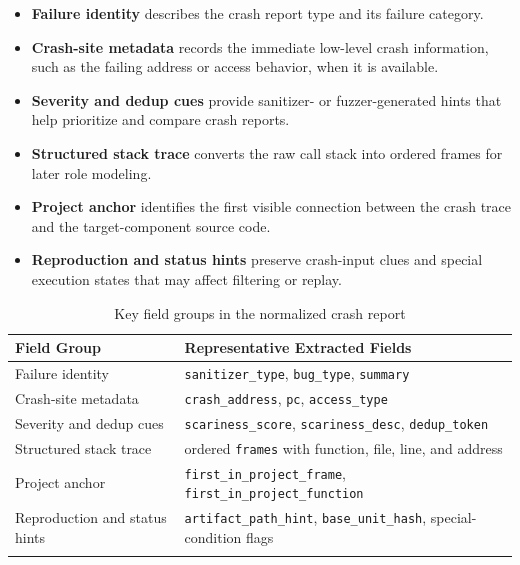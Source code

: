 \documentclass[pdflatex,sn-basic]{sn-jnl}%
\renewcommand{\arraystretch}{1.16}%
\newcommand{\compacttable}{\scriptsize\setlength{\tabcolsep}{2.2pt}\renewcommand{\arraystretch}{1.12}}%
\theoremstyle{thmstyleone}%
\theoremstyle{thmstyletwo}%
\theoremstyle{thmstylethree}%
\begin{document}
\begin{itemize}
    \item \textbf{Failure identity} describes the crash report type and its failure category.
    \item \textbf{Crash-site metadata} records the immediate low-level crash information, such as the failing address or access behavior, when it is available.
    \item \textbf{Severity and dedup cues} provide sanitizer- or fuzzer-generated hints that help prioritize and compare crash reports.
    \item \textbf{Structured stack trace} converts the raw call stack into ordered frames for later role modeling.
    \item \textbf{Project anchor} identifies the first visible connection between the crash trace and the target-component source code.
    \item \textbf{Reproduction and status hints} preserve crash-input clues and special execution states that may affect filtering or replay.
\end{itemize}

\begin{table}[t]
\caption{Key field groups in the normalized crash report}
\label{tab:sanitizer-normalized-fields}
\centering
\compacttable
\setlength{\tabcolsep}{4.0pt}
\renewcommand{\arraystretch}{1.10}
\begin{tabular*}{\linewidth}{@{\extracolsep{\fill}}ll}
\toprule
\textbf{Field Group} & \textbf{Representative Extracted Fields} \\
\midrule
Failure identity & \texttt{sanitizer\_type}, \texttt{bug\_type}, \texttt{summary} \\
Crash-site metadata & \texttt{crash\_address}, \texttt{pc}, \texttt{access\_type} \\
Severity and dedup cues & \texttt{scariness\_score}, \texttt{scariness\_desc}, \texttt{dedup\_token} \\
Structured stack trace & ordered \texttt{frames} with function, file, line, and address \\
Project anchor & \texttt{first\_in\_project\_frame}, \texttt{first\_in\_project\_function} \\
Reproduction and status hints & \texttt{artifact\_path\_hint}, \texttt{base\_unit\_hash}, special-condition flags \\
\botrule
\end{tabular*}
\end{table}
\FloatBarrier
\end{document}
